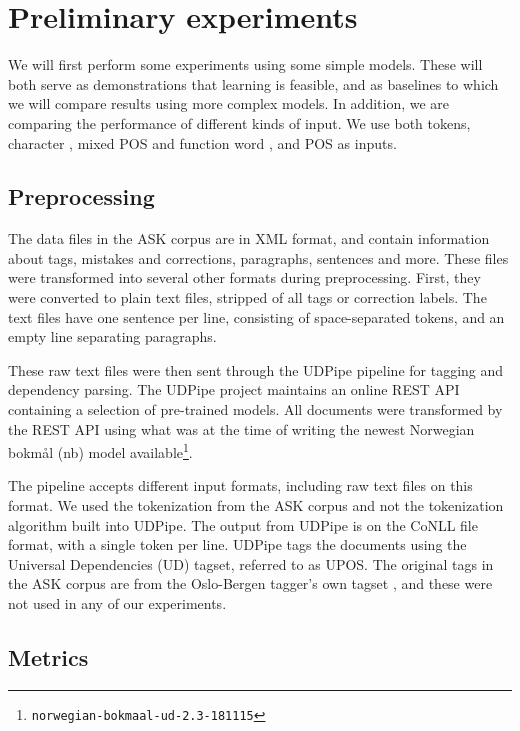 \chapter{Preliminary experiments}

We will first perform some experiments using some simple models. These will
both serve as demonstrations that learning is feasible, and as baselines to
which we will compare results using more complex models. In addition, we are
comparing the performance of different kinds of input. We use both tokens,
character \ngrams, mixed POS and function word \ngrams, and \ac{POS} \ngrams
as inputs.


\section{Preprocessing}

The data files in the ASK corpus are in \ac{XML} format, and contain
information about tags, mistakes and corrections, paragraphs, sentences and
more. These files were transformed into several other formats during
preprocessing. First, they were converted to plain text files, stripped of
all tags or correction labels. The text files have one sentence per line,
consisting of space-separated tokens, and an empty line separating
paragraphs.

These raw text files were then sent through the UDPipe pipeline
\autocite{udpipe:2017} for tagging and dependency parsing. The UDPipe project
maintains an online REST \ac{API} containing a selection of pre-trained
models. All documents were transformed by the REST \ac{API} using what was at
the time of writing the newest Norwegian bokmål (nb) model
available\footnote{\texttt{norwegian-bokmaal-ud-2.3-181115}}.

The pipeline accepts different input formats, including raw text files on
this format. We used the tokenization from the ASK corpus and not the
tokenization algorithm built into UDPipe. The output from UDPipe is on the
CoNLL file format, with a single token per line. UDPipe tags the documents
using the Universal Dependencies (UD) tagset, referred to as UPOS. The
original tags in the ASK corpus are from the Oslo-Bergen tagger's own tagset
\autocite{oslobergen}, and these were not used in any of our experiments.


\section{Metrics}
\label{metrics-discussion}

